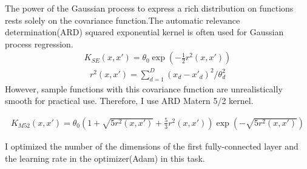 The power of the Gaussian process to express a rich distribution on functions rests solely on the covariance function.The automatic relevance determination(ARD) squared exponential kernel is often used for Gaussian process regression.
\begin{eqnarray}
K_{SE}(x,x')=\theta_{0}\exp{(-\frac{1}{2}r^2(x,x'))} 
\end{eqnarray}
\begin{eqnarray}
r^2(x,x')=\sum^{D}_{d=1}(x_{d}-x'_{d})^2/\theta^2_{d}
\end{eqnarray}
However, sample functions with this covariance function are unrealistically smooth for practical use. Therefore,  I use ARD Matern 5/2 kernel.

\begin{eqnarray}
K_{M52}(x,x')=\theta_{0}(1+\sqrt{5r^2(x,x')}+\frac{5}{3}r^2(x,x'))\exp{(-\sqrt{5r^2(x,x')})}
\end{eqnarray}

I optimized the number of the dimensions of the first fully-connected layer and the learning rate in the optimizer(Adam) in this task.
